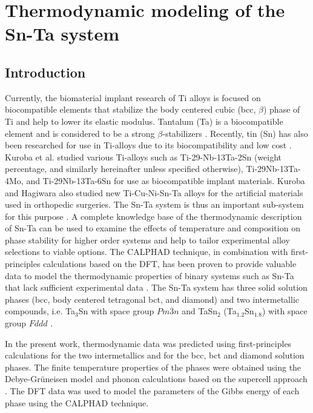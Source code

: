 \chapter{Thermodynamic modeling of the Sn-Ta system}

\section{Introduction}

Currently, the biomaterial implant research of Ti alloys is focused on biocompatible elements that stabilize the body centered cubic (bcc, $\beta$) phase of Ti and help to lower its elastic modulus. Tantalum (Ta) is a biocompatible element and is considered to be a strong $\beta$-stabilizers \cite{Brailovski2011b}. Recently, tin (Sn) has also been researched for use in Ti-alloys due to its biocompatibility and low cost \cite{Niinomi2012}. Kuroba et al. \cite{Kuroda1998} studied various Ti-alloys such as Ti-29-Nb-13Ta-2Sn (weight percentage, and similarly hereinafter unless specified otherwise), Ti-29Nb-13Ta-4Mo, and Ti-29Nb-13Ta-6Sn for use as biocompatible implant materials. Kuroba and Hagiwara \cite{He2004} also studied new Ti-Cu-Ni-Sn-Ta alloys for the artificial materials used in orthopedic surgeries. The Sn-Ta system is thus an important sub-system for this purpose \cite{He2006}.  A complete knowledge base of the thermodynamic description of Sn-Ta can be used to examine the effects of temperature and composition on phase stability for higher order systems and help to tailor experimental alloy selections to viable options. The CALPHAD technique, in combination with first-principles calculations based on the DFT, has been proven to provide valuable data to model the thermodynamic properties of binary systems such as Sn-Ta that lack sufficient experimental data \cite{Liu2009}. The Sn-Ta system has three solid solution phases (bcc, body centered tetragonal bct, and diamond) and two intermetallic compounds, i.e. Ta$_{3}$Sn with space group $Pm\overline{3}n$ and TaSn$_{2}$ (Ta$_{1.2}$Sn$_{1.8}$) with space group $Fddd$ \cite{Okamoto2003}.

 In the present work, thermodynamic data was predicted using first-principles calculations for the two intermetallics and for the bcc, bct and diamond solution phases. The finite temperature properties of the phases were obtained using the Debye-Gr\"uneisen model \cite{Shang2010} and phonon calculations based on the supercell approach \cite{Wang2012}. The DFT data was used to model the parameters of the Gibbs energy of each phase using the CALPHAD technique.

